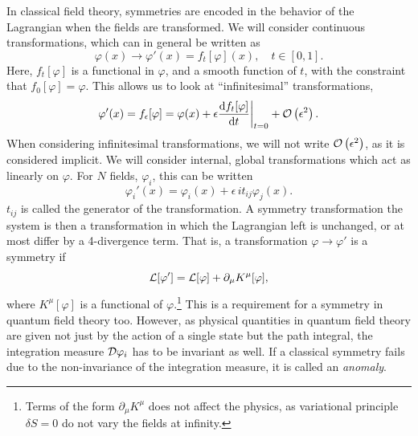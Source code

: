 In classical field theory, symmetries are encoded in the behavior of the Lagrangian when the fields are transformed.
We will consider continuous transformations, which can in general be written as
\begin{equation}
    \varphi(x) \longrightarrow \varphi'(x) = f_t[\varphi](x), \quad t \in [0, 1].
\end{equation}
Here, $f_t[\varphi]$ is a functional in $\varphi$, and a smooth function of $t$, with the constraint that $f_0[\varphi] = \varphi$.
This allows us to look at ``infinitesimal'' transformations,
\begin{equation}
    \label{infinitesimal transformation}
    \varphi'(x) = f_\epsilon[\varphi] 
    = \varphi(x) + \epsilon \diff{ f_t[\varphi] }{t}\bigg |_{t=0} + \Oh{\epsilon}.
\end{equation}
When considering infinitesimal transformations, we will not write $\mathcal{O}\left(\epsilon^{2}\right)$, as it is considered implicit.
We will consider internal, global transformations which act as linearly on $\varphi$.
For $N$ fields, $\varphi_i$, this can be written
\begin{equation}
    \label{linear field transformation}
    \varphi_i'(x) = \varphi_i(x) + \epsilon \, i t_{ij} \varphi_j(x).
\end{equation}
$t_{ij}$ is called the generator of the transformation.
A symmetry transformation the system is then a transformation in which the Lagrangian left is unchanged, or at most differ by a 4-divergence term.
That is, a transformation $\varphi \rightarrow \varphi'$ is a symmetry if 
\begin{equation}
    \mathcal{L}[\varphi'] = \mathcal{L}[\varphi] + \partial_\mu K^\mu[\varphi],
\end{equation}
where $K^\mu[\varphi]$ is a functional of $\varphi$.\footnote{Terms of the form $\partial_\mu K^\mu$ does not affect the physics, as variational principle $\delta S = 0$ do not vary the fields at infinity.}
This is a requirement for a symmetry in quantum field theory too.
However, as physical quantities in quantum field theory are given not just by the action of a single state but the path integral, the integration measure $\mathcal{D} \varphi_i$ has to be invariant as well.
If a classical symmetry fails due to the non-invariance of the integration measure, it is called an \emph{anomaly}.

